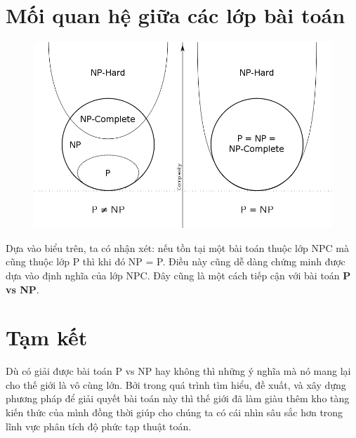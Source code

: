 \documentclass[a4paper 14pt]{extarticle}
\begin{document}
	\section{Mối quan hệ giữa các lớp bài toán}
	\begin{figure}[H]
	\includegraphics[scale = 0.4]{Venn.png}
	\end{figure}
	
	Dựa vào biểu trên, ta có nhận xét: nếu tồn tại một bài toán thuộc lớp NPC mà cũng thuộc lớp P thì khi đó NP = P. Điều này cũng dễ dàng chứng minh được dựa vào định nghĩa của lớp NPC. Đây cũng là một cách tiếp cận với bài toán \textbf{P vs NP}.
	
	\section{Tạm kết}
	Dù có giải được bài toán P vs NP hay không thì những ý nghĩa mà nó mang lại cho thế giới là vô cùng lớn. Bởi trong quá trình tìm hiểu, đề xuất, và xây dựng phương pháp để giải quyết bài toán này thì thế giới đã làm giàu thêm kho tàng kiến thức của mình đồng thời giúp cho chúng ta có cái nhìn sâu sắc hơn trong lĩnh vực phân tích độ phức tạp thuật toán.
\end{document}
